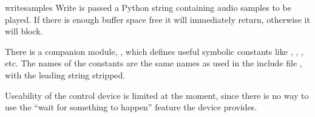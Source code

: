 \begin{funcdesc}{write}{samples}
Write is passed a Python string containing audio samples to be played.
If there is enough buffer space free it will immediately return,
otherwise it will block.
\end{funcdesc}

There is a companion module, , which defines useful
symbolic constants like , ,
, etc. The names of
the constants are the same names as used in the \C{} include file
, with the leading string 
stripped.

Useability of the control device is limited at the moment, since there
is no way to use the ``wait for something to happen'' feature the
device provides.

